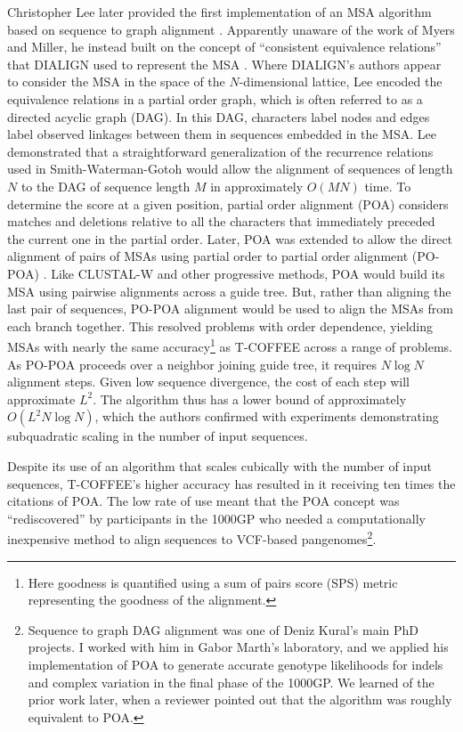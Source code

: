 \documentclass[a4paper,12pt,numbered,oneside]{Classes/PhDThesisPSnPDF}
\begin{document}
Christopher Lee later provided the first implementation of an MSA algorithm based on sequence to graph alignment \cite{lee2002POA}.
Apparently unaware of the work of Myers and Miller, he instead built on the concept of ``consistent equivalence relations'' that DIALIGN used to represent the MSA \cite{morgenstern1996multiple}.
Where DIALIGN's authors appear to consider the MSA in the space of the $N$-dimensional lattice, Lee encoded the equivalence relations in a partial order graph, which is often referred to as a directed acyclic graph (DAG).
In this DAG, characters label nodes and edges label observed linkages between them in sequences embedded in the MSA.
Lee demonstrated that a straightforward generalization of the recurrence relations used in Smith-Waterman-Gotoh would allow the alignment of sequences of length $N$ to the DAG of sequence length $M$ in approximately $O(MN)$ time.
To determine the score at a given position, partial order alignment (POA) considers matches and deletions relative to all the characters that immediately preceded the current one in the partial order.
Later, POA was extended to allow the direct alignment of pairs of MSAs using partial order to partial order alignment (PO-POA) \cite{grasso2004combining}.
Like CLUSTAL-W and other progressive methods, POA would build its MSA using pairwise alignments across a guide tree.
But, rather than aligning the last pair of sequences, PO-POA alignment would be used to align the MSAs from each branch together.
This resolved problems with order dependence, yielding MSAs with nearly the same accuracy\footnote{Here goodness is quantified using a sum of pairs score (SPS) metric representing the goodness of the alignment.} as T-COFFEE across a range of problems.
As PO-POA proceeds over a neighbor joining guide tree, it requires $N \log{N}$ alignment steps.
Given low sequence divergence, the cost of each step will approximate $L^2$.
The algorithm thus has a lower bound of approximately $O(L^{2}N\log{N})$, which the authors confirmed with experiments demonstrating subquadratic scaling in the number of input sequences.

Despite its use of an algorithm that scales cubically with the number of input sequences, T-COFFEE's higher accuracy has resulted in it receiving ten times the citations of POA.
The low rate of use meant that the POA concept was ``rediscovered'' by participants in the 1000GP who
needed a computationally inexpensive method to align sequences to VCF-based pangenomes\footnote{Sequence to graph DAG alignment was one of Deniz Kural's main PhD projects. I worked with him in Gabor Marth's laboratory, and we applied his implementation of POA to generate accurate genotype likelihoods for indels and complex variation in the final phase of the 1000GP. We learned of the prior work later, when a reviewer pointed out that the algorithm was roughly equivalent to POA.}.
\end{document}
